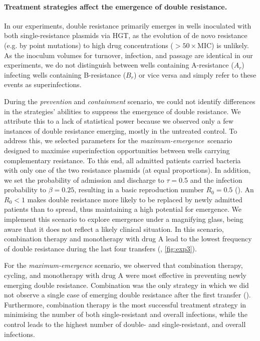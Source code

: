 \paragraph{Treatment strategies affect the emergence of double resistance.}
In our experiments, double resistance primarily emerges in wells inoculated with both single-resistance plasmids via HGT, as the evolution of de novo resistance (e.g. by point mutations) to high drug concentrations ($>50 \times$MIC) is unlikely.
As the inoculum volumes for turnover, infection, and passage are identical in our experiments, we do not distinguish between wells containing A-resistance ($A_r$) infecting wells containing B-resistance ($B_r$) or vice versa and simply refer to these events as superinfections.

During the \textit{prevention} and \textit{containment} scenario, we could not identify differences in the strategies' abilities to suppress the emergence of double resistance. 
We attribute this to a lack of statistical power because we observed only a few instances of double resistance emerging, mostly in the untreated control. 
To address this, we selected parameters for the \textit{maximum-emergence}~scenario designed to maximise superinfection opportunities between wells carrying complementary resistance. 
To this end, all admitted patients carried bacteria with only one of the two resistance plasmids (at equal proportions). 
In addition, we set the probability of admission and discharge to $\tau = 0.5$ and the infection probability to $\beta = 0.25$, resulting in a basic reproduction number $R_0 = 0.5$ ().
An $R_0<1$ makes double resistance more likely to be replaced by newly admitted patients than to spread, thus maintaining a high potential for emergence.
We implement this scenario to explore emergence under a magnifying glass, being aware that it does not reflect a likely clinical situation. In this scenario, combination therapy and monotherapy with drug A lead to the lowest frequency of double resistance during the last four transfers (, \autoref{fig:exp3}).

For the \textit{maximum-emergence} scenario, we observed that combination therapy, cycling, and monotherapy with drug A were most effective in preventing newly emerging double resistance. 
Combination was the only strategy in which we did not observe a single case of emerging double resistance after the first transfer ().
Furthermore, combination therapy is the most successful treatment strategy in minimising the number of both single-resistant and overall infections, while the control leads to the highest number of double- and single-resistant, and overall infections.

